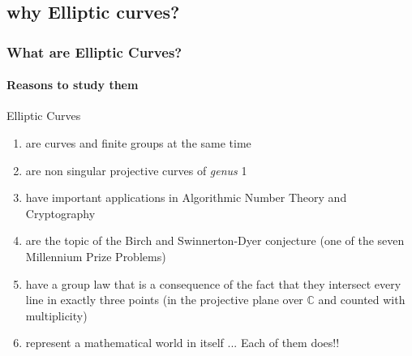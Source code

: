 \documentclass[10pt,final]{beamer} %
\newcommand{\C}{\mathbb C}
\theoremstyle{definition}
\begin{document}
\begin{frame}
\begin{columns}[c]
\begin{column}{6cm}
\end{column}
\end{columns}
\end{frame}

\subsection{why Elliptic curves?}
\begin{frame}\frametitle{What are Elliptic Curves?}
\framesubtitle{Reasons to study them}\pause

Elliptic Curves
\begin{enumerate}[<+-| alert@+>]
\item are curves and finite groups at the same time
\item are non singular projective curves of \emph{genus} 1
\item have important applications in Algorithmic Number Theory and Cryptography
\item are the topic of the \alert{Birch and Swinnerton-Dyer conjecture} (one of the seven Millennium Prize Problems)
\item have a group law that is a consequence of the fact that they intersect every line in
exactly three points (in the projective plane over $\C$ and counted with multiplicity)
\item represent a mathematical world in itself ... Each of them does!!
\end{enumerate}
\end{frame}
\end{document}
